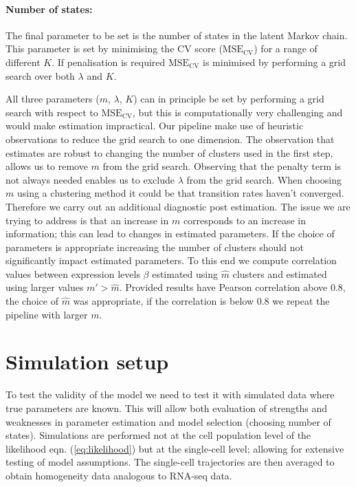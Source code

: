 \paragraph{Number of states:}
\label{sec:number-states}

The final parameter to be set is the number of states in the latent Markov chain. This parameter is set by minimising the CV score ($\mathrm{MSE_{CV}}$) for a range of different $K$. If penalisation is required $\mathrm{MSE_{CV}}$ is minimised by performing a grid search over both $\lambda$ and $K$.

All three parameters ($m$, $\lambda$, $K$) can in principle be set by performing a grid search with respect to $\mathrm{MSE_{CV}}$, but this is computationally very challenging and would make estimation impractical. Our pipeline make use of heuristic observations to reduce the grid search to one dimension. The observation that estimates are robust to changing the number of clusters used in the first step, allows us to remove $m$ from the grid search. Observing that the penalty term is not always needed enables us to exclude $\lambda$ from the grid search. When choosing $m$ using a clustering method it could be that transition rates haven't converged. Therefore we carry out an additional diagnostic post estimation. The issue we are trying to address is that an increase in $m$ corresponds to an increase in information; this can lead to changes in estimated parameters. If the choice of parameters is appropriate increasing the number of clusters should not significantly impact estimated parameters. To this end we compute correlation values between expression levels $\beta$ estimated using $\hat{m}$ clusters and estimated using larger values $m' > \hat{m}$. Provided results have Pearson correlation above $0.8$, the choice of $\hat{m}$ was appropriate, if the correlation is below $0.8$ we repeat the pipeline with larger $m$. 

\section{Simulation setup}
\label{sec:sim-study}

To test the validity of the model we need to test it with simulated data where true parameters are known. This will allow both evaluation of strengths and weaknesses in parameter estimation and model selection (choosing number of states). Simulations are performed not at the cell population level of the likelihood eqn. (\ref{eq:likelihood}) but at the single-cell level; allowing for extensive testing of model assumptions. The single-cell trajectories are then averaged to obtain homogeneity data analogous to RNA-seq data.

